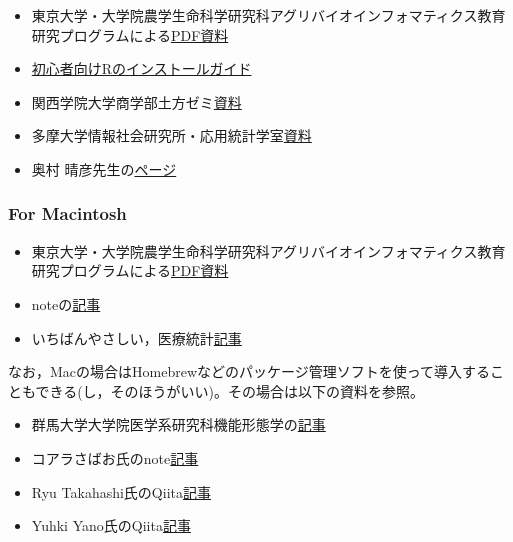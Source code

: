 \documentclass[
  a4paper,
]{ltjsbook}
\providecommand{\tightlist}{%
  \setlength{\itemsep}{0pt}\setlength{\parskip}{0pt}}
\begin{document}
\begin{itemize}
\tightlist
\item
  東京大学・大学院農学生命科学研究科アグリバイオインフォマティクス教育研究プログラムによる\href{https://www.iu.a.u-tokyo.ac.jp/textbook/R/R1.010_win.pdf}{PDF資料}
\item
  \href{https://syunsuke.github.io/r_install_guide_for_beginners/}{初心者向けRのインストールガイド}
\item
  関西学院大学商学部土方ゼミ\href{http://soc-research.org/ja/r_install_windows/}{資料}
\item
  多摩大学情報社会研究所・応用統計学室\href{https://stats.ni.tama.ac.jp/?p=46}{資料}
\item
  奥村
  晴彦先生の\href{https://okumuralab.org/~okumura/stat/R-win.html}{ページ}
\end{itemize}

\subsubsection{For Macintosh}\label{for-macintosh}

\begin{itemize}
\tightlist
\item
  東京大学・大学院農学生命科学研究科アグリバイオインフォマティクス教育研究プログラムによる\href{https://www.iu.a.u-tokyo.ac.jp/textbook/R/R1.010_mac.pdf}{PDF資料}
\item
  noteの\href{https://note.com/toshi_matsuura/n/n127cf28362e5}{記事}
\item
  いちばんやさしい，医療統計\href{https://best-biostatistics.com/r/rstudio_start.html\#i-3}{記事}
\end{itemize}

なお，Macの場合はHomebrewなどのパッケージ管理ソフトを使って導入することもできる(し，そのほうがいい)。その場合は以下の資料を参照。

\begin{itemize}
\tightlist
\item
  群馬大学大学院医学系研究科機能形態学の\href{https://anatomy.med.gunma-u.ac.jp/protocols/?p=979}{記事}
\item
  コアラさばお氏のnote\href{https://note.com/mackerelman/n/nfbf8054e90d5}{記事}
\item
  Ryu
  Takahashi氏のQiita\href{https://qiita.com/ryu-takahashi2718/items/1118cad7a4ef4900da96}{記事}
\item
  Yuhki
  Yano氏のQiita\href{https://qiita.com/y-vectorfield/items/dd1a8e2715cace9981ec}{記事}
\end{itemize}
\end{document}

